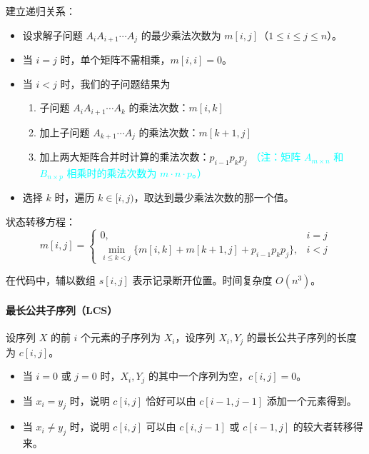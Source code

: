 \documentclass[UTF8]{ctexart}
\newcommand\Emph[1]{\textcolor{cyan!80!black}{#1}}
\begin{document}
建立递归关系：
\begin{itemize}[itemsep=0pt,parsep=0pt]
  \item 设求解子问题 $A_i A_{i+1}\cdots A_j$ 的最少乘法次数为 $m[i,j]$（$1\leqslant i\leqslant j\leqslant n$）。
  \item 当 $i=j$ 时，单个矩阵不需相乘，$m[i,i]=0$。
  \item 当 $i<j$ 时，我们的子问题结果为
  \begin{enumerate}[itemsep=0pt,parsep=0pt]
    \item 子问题 $A_i A_{i+1}\cdots A_k$ 的乘法次数：$m[i,k]$
    \item 加上子问题 $A_{k+1}\cdots A_j$ 的乘法次数：$m[k+1,j]$
    \item 加上两大矩阵合并时计算的乘法次数：$p_{i-1} p_k p_j$ \textcolor{cyan}{（注：矩阵 $A_{m\times n}$ 和 $B_{n\times p}$ 相乘时的乘法次数为 $m\cdot n\cdot p$。）}
  \end{enumerate}
  \item 选择 $k$ 时，遍历 $k\in [i,j)$，取达到最少乘法次数的那一个值。
\end{itemize}

状态转移方程：
\begin{equation*}
    m[i,j] = \begin{cases}
               0, & i=j \\
               \min\limits_{i\leqslant k<j} \{m[i,k] + m[k+1,j] + p_{i-1}p_kp_j\}, & i<j 
             \end{cases}
\end{equation*}

在代码中，辅以数组 $s[i,j]$ 表示记录断开位置。\Emph{时间复杂度 $O(n^3)$。}

\paragraph{最长公共子序列（LCS）} 设序列 $X$ 的前 $i$ 个元素的子序列为 $X_i$，设序列 $X_i,Y_j$ 的最长公共子序列的长度为 $c[i,j]$。

\begin{itemize}
  \item 当 $i=0$ 或 $j=0$ 时，$X_i,Y_j$ 的其中一个序列为空，$c[i,j]=0$。
  \item 当 $x_i=y_j$ 时，说明 $c[i,j]$ 恰好可以由 $c[i-1,j-1]$ 添加一个元素得到。
  \item 当 $x_i\ne y_j$ 时，说明 $c[i,j]$ 可以由 $c[i,j-1]$ 或 $c[i-1,j]$ 的较大者转移得来。
\end{itemize}
\end{document}
